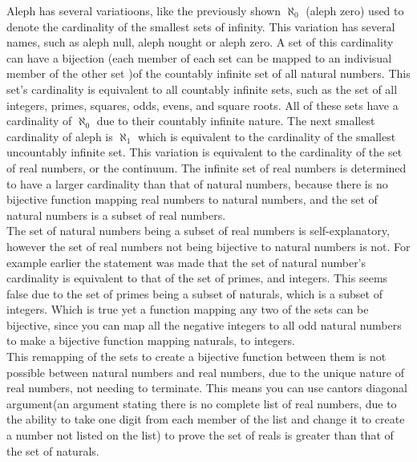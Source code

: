 \documentclass{article}
\begin{document}
\begin{large}
     Aleph has several variatioons, like the previously shown $ \aleph_0$ (aleph zero) used to denote the cardinality of the smallest sets of infinity.
This variation has several names, such as aleph null, aleph nought or aleph zero.
A set of this cardinality can have a bijection (each member of each set can be mapped to an indivisual member of the other set )of the countably infinite set of all natural numbers.
This set's cardinality is equivalent to all countably infinite sets, such as the set of all integers, primes, squares, odds, evens, and square roots.
All of these sets have a cardinality of $ \aleph_0$ due to their countably infinite nature.
The next smallest cardinality of aleph is $ \aleph_1$ which is equivalent to the cardinality of the smallest uncountably infinite set.
This variation is equivalent to the cardinality of the set of real numbers, or the continuum.
The infinite set of real numbers is determined to have a larger cardinality than that of natural numbers, because there is no bijective function mapping real numbers to natural numbers, and the set of natural numbers is a subset of real numbers.
\\


      The set of natural numbers being a subset of real numbers is self-explanatory, however the set of real numbers not being bijective to natural numbers is not.
For example earlier the statement was made that the set of natural number's cardinality is equivalent to that of the set of primes, and integers.
This seems false due to the set of primes being a subset of naturals, which is a subset of integers.
Which  is true yet a function mapping any two of the sets can be bijective, since you can map all the negative integers to all odd natural numbers to make a bijective function mapping naturals, to integers.
\\


     This  remapping of the sets to create a bijective function between them is not possible between natural numbers and real numbers, due to the unique nature of real numbers, not needing to terminate.
This means you can use cantors diagonal argument(an argument stating there is no complete list of real numbers, due to the ability to take one digit from each member of the list and change it to create a number not listed on the list) to prove the set of reals is greater than that of the set of naturals.
\\


\end{large}
\end{document}
